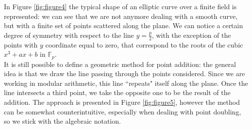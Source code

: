 In Figure \ref{fig:figure4} the typical shape of an elliptic curve over a finite field is represented: we can see that we are not anymore dealing with a smooth curve, but with a finite set of points scattered along the plane. We can notice a certain degree of symmetry with respect to the line $y = \frac{p}{2}$, with the exception of the points with $y$ coordinate equal to zero, that correspond to the roots of the cubic $x^3 + ax + b$ in $\mathbb{F}_p$.
\\
It is still possible to define a geometric method for point addition: the general idea is that we draw the line passing through the points considered. Since we are working in modular arithmetic, this line ``repeats" itself along the plane. Once the line intersects a third point, we take the opposite one to be the result of the addition. The approach is presented in Figure \ref{fig:figure5}, however the method can be somewhat counterintuitive, especially when dealing with point doubling, so we stick with the algebraic notation.

